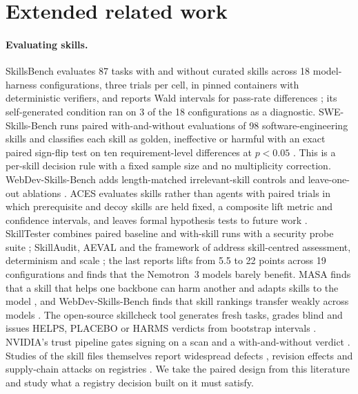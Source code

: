 \section{Extended related work}
\label{app:related}

\paragraph{Evaluating skills.} SkillsBench evaluates 87 tasks with and without curated skills across 18 model-harness configurations, three trials per cell, in pinned containers with deterministic verifiers, and reports Wald intervals for pass-rate differences \citep{li2026skillsbench}; its self-generated condition ran on 3 of the 18 configurations as a diagnostic. SWE-Skills-Bench runs paired with-and-without evaluations of 98 software-engineering skills and classifies each skill as golden, ineffective or harmful with an exact paired sign-flip test on ten requirement-level differences at $p<0.05$ \citep{han2026sweskillsbench}. This is a per-skill decision rule with a fixed sample size and no multiplicity correction. WebDev-Skills-Bench adds length-matched irrelevant-skill controls and leave-one-out ablations \citep{yang2026webdevskills}. ACES evaluates skills rather than agents with paired trials in which prerequisite and decoy skills are held fixed, a composite lift metric and confidence intervals, and leaves formal hypothesis tests to future work \citep{kevin2026aces}. SkillTester combines paired baseline and with-skill runs with a security probe suite \citep{wang2026skilltester}; SkillAudit, AEVAL and the framework of \citet{shaposhnikov2026framework} address skill-centred assessment, determinism and scale \citep{yu2026skillaudit,anand2026aeval}; the last reports lifts from 5.5 to 22 points across 19 configurations and finds that the Nemotron~3 models barely benefit. MASA finds that a skill that helps one backbone can harm another and adapts skills to the model \citep{yu2026masa}, and WebDev-Skills-Bench finds that skill rankings transfer weakly across models \citep{yang2026webdevskills}. The open-source skillcheck tool generates fresh tasks, grades blind and issues HELPS, PLACEBO or HARMS verdicts from bootstrap intervals \citep{sx4im2026skillcheck}. NVIDIA's trust pipeline gates signing on a scan and a with-and-without verdict \citep{nvidia2026trustpipeline,nvidia2026skillspector,nvidia2026skillevaluator}. Studies of the skill files themselves report widespread defects \citep{zhang2026reusable}, revision effects \citep{wang2026skillrevisions} and supply-chain attacks on registries \citep{saha2026skillmd}. We take the paired design from this literature and study what a registry decision built on it must satisfy.

